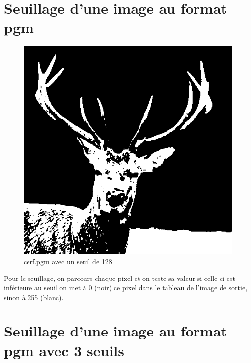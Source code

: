 \documentclass{article}
\begin{document}
\section{Seuillage d'une image au format pgm}


\begin{figure}[h]
\centerline{\includegraphics[scale=0.3]{./rendus/cerf1Seuil.png}}
\caption{cerf.pgm avec un seuil de 128}
\end{figure}

Pour le seuillage, on parcours chaque pixel et on teste sa valeur si celle-ci est inférieure au seuil on met à 0 (noir) ce pixel dans le tableau de l'image de sortie, sinon à 255 (blanc).

\section{Seuillage d'une image au format pgm avec 3 seuils }
\end{document}
